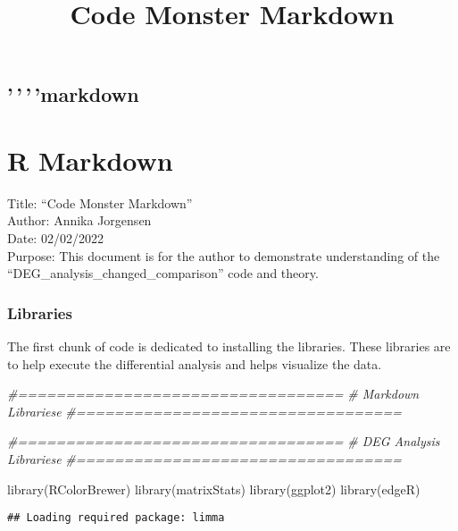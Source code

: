 \documentclass[
]{article}
\title{Code Monster Markdown}
\author{}
\date{\vspace{-2.5em}}
\newenvironment{Shaded}{\begin{snugshade}}{\end{snugshade}}
\newcommand{\CommentTok}[1]{\textcolor[rgb]{0.56,0.35,0.01}{\textit{#1}}}
\newcommand{\FunctionTok}[1]{\textcolor[rgb]{0.00,0.00,0.00}{#1}}
\newcommand{\NormalTok}[1]{#1}
\begin{document}
\maketitle

\hypertarget{markdown}{%
\subsection{'\,'\,'\,'markdown}\label{markdown}}

\hypertarget{r-markdown}{%
\section{\texorpdfstring{\textbf{R
Markdown}}{R Markdown}}\label{r-markdown}}

Title: ``Code Monster Markdown''\\
Author: Annika Jorgensen\\
Date: 02/02/2022\\
Purpose: This document is for the author to demonstrate understanding of
the ``DEG\_analysis\_changed\_comparison'' code and theory.

\hypertarget{libraries}{%
\subsubsection{\texorpdfstring{\textbf{Libraries}}{Libraries}}\label{libraries}}

The first chunk of code is dedicated to installing the libraries. These
libraries are to help execute the differential analysis and helps
visualize the data.

\begin{Shaded}
\begin{Highlighting}[]
\CommentTok{\#==================================}
\CommentTok{\# Markdown Librariese }
\CommentTok{\#==================================}

\CommentTok{\#==================================}
\CommentTok{\# DEG Analysis Librariese }
\CommentTok{\#==================================}

\FunctionTok{library}\NormalTok{(RColorBrewer)}
\FunctionTok{library}\NormalTok{(matrixStats)}
\FunctionTok{library}\NormalTok{(ggplot2)}
\FunctionTok{library}\NormalTok{(edgeR)}
\end{Highlighting}
\end{Shaded}

\begin{verbatim}
## Loading required package: limma
\end{verbatim}
\end{document}
